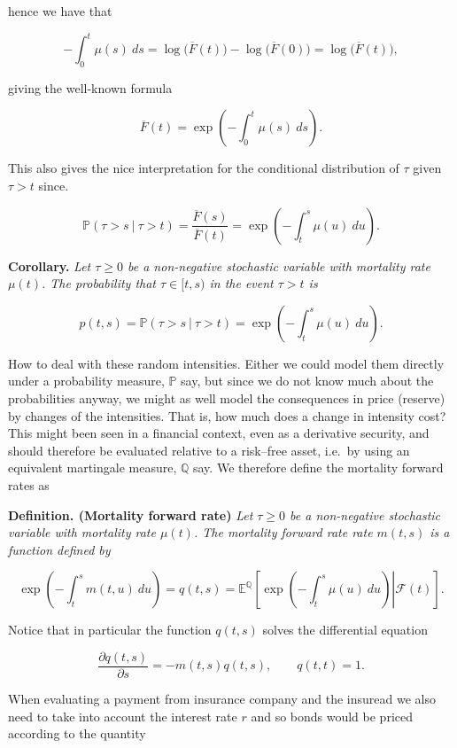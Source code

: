 \documentclass[
]{book}
\begin{document}
hence we have that

\[
-\int_0^t\mu(s)\ ds=\log\Big(\overline F(t)\Big)-\log\Big(\overline F(0)\Big)=\log\Big(\overline F(t)\Big),
\]

giving the well-known formula

\[
\overline F(t)=\exp\left(-\int_0^t\mu(s)\ ds\right).
\]

This also gives the nice interpretation for the conditional distribution of \(\tau\) given \(\tau>t\) since.

\[
\mathbb P(\tau > s\ \vert\ \tau > t)=\frac{\overline F(s)}{\overline F(t)}=\exp\left(-\int_t^s\mu(u)\ du\right).
\]

\textbf{Corollary.} \emph{Let \(\tau\ge 0\) be a non-negative stochastic variable with mortality rate \(\mu(t)\). The probability that \(\tau \in [t,s)\) in the event \(\tau >t\) is}

\[
p(t,s)=\mathbb P(\tau > s\ \vert\ \tau > t)=\exp\left(-\int_t^s\mu(u)\ du\right).
\]

How to deal with these random intensities. Either we could model them directly under a probability measure, \(\mathbb P\) say, but since we do not know much about the probabilities anyway, we might as well model the consequences in price (reserve) by changes of the intensities. That is, how much does a change in intensity cost? This might been seen in a financial context, even as a derivative security, and should therefore be evaluated relative to a risk--free asset, i.e.~by using an equivalent martingale measure, \(\mathbb Q\) say. We therefore define the mortality forward rates as

\textbf{Definition. (Mortality forward rate)} \emph{Let \(\tau\ge 0\) be a non-negative stochastic variable with mortality rate \(\mu(t)\). The mortality forward rate rate \(m(t,s)\) is a function defined by}

\[
\exp\left(-\int_t^s m(t,u)\ du\right)=q(t,s)=\mathbb E^{\mathbb Q}\left[\left. \exp\left(-\int_t^s\mu(u)\ du\right)\right\vert \mathcal F(t)\right].
\]

Notice that in particular the function \(q(t,s)\) solves the differential equation

\[
\frac{\partial q(t,s)}{\partial s}=-m(t,s)q(t,s),\qquad q(t,t)=1.
\]

When evaluating a payment from insurance company and the insuread we also need to take into account the interest rate \(r\) and so bonds would be priced according to the quantity
\end{document}
